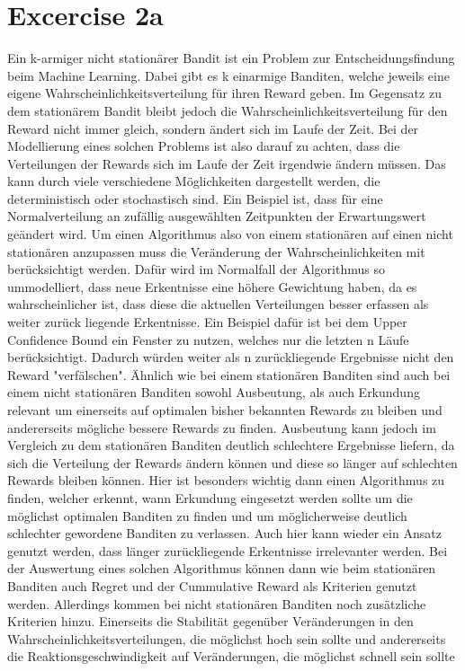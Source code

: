 \documentclass[12pt, a4paper,DIV=12, bibliography=totocnumbered]{scrartcl}
\begin{document}
\section{Excercise 2a}
Ein k-armiger nicht stationärer Bandit ist ein Problem zur Entscheidungsfindung beim Machine
Learning. Dabei gibt es k einarmige Banditen, welche jeweils eine eigene
Wahrscheinlichkeitsverteilung für ihren Reward geben.
Im Gegensatz zu dem stationärem Bandit bleibt jedoch die Wahrscheinlichkeitsverteilung für den
Reward nicht immer gleich, sondern ändert sich im Laufe der Zeit. Bei der Modellierung eines
solchen Problems ist also darauf zu achten, dass die Verteilungen der Rewards sich im Laufe der
Zeit irgendwie ändern müssen. Das kann durch viele verschiedene Möglichkeiten dargestellt
werden, die deterministisch oder stochastisch sind. Ein Beispiel ist, dass für eine Normalverteilung
an zufällig ausgewählten Zeitpunkten der Erwartungswert geändert wird. Um einen Algorithmus
also von einem stationären auf einen nicht stationären anzupassen muss die Veränderung der
Wahrscheinlichkeiten mit berücksichtigt werden. Dafür wird im Normalfall der Algorithmus so
ummodelliert, dass neue Erkentnisse eine höhere Gewichtung haben, da es wahrscheinlicher ist,
dass diese die aktuellen Verteilungen besser erfassen als weiter zurück liegende Erkentnisse. Ein
Beispiel dafür ist bei dem Upper Confidence Bound ein Fenster zu nutzen, welches nur die letzten n
Läufe berücksichtigt. Dadurch würden weiter als n zurückliegende Ergebnisse nicht den Reward
"verfälschen". Ähnlich wie bei einem stationären Banditen sind auch bei einem nicht stationären
Banditen sowohl Ausbeutung, als auch Erkundung relevant um einerseits auf optimalen bisher
bekannten Rewards zu bleiben und andererseits mögliche bessere Rewards zu finden. Ausbeutung
kann jedoch im Vergleich zu dem stationären Banditen deutlich schlechtere Ergebnisse liefern, da
sich die Verteilung der Rewards ändern können und diese so länger auf schlechten Rewards bleiben
können. Hier ist besonders wichtig dann einen Algorithmus zu finden, welcher erkennt, wann
Erkundung eingesetzt werden sollte um die möglichst optimalen Banditen zu finden und um
möglicherweise deutlich schlechter gewordene Banditen zu verlassen. Auch hier kann wieder ein
Ansatz genutzt werden, dass länger zurückliegende Erkentnisse irrelevanter werden. Bei der
Auswertung eines solchen Algorithmus können dann wie beim stationären Banditen auch Regret
und der Cummulative Reward als Kriterien genutzt werden. Allerdings kommen bei nicht
stationären Banditen noch zusätzliche Kriterien hinzu. Einerseits die Stabilität gegenüber
Veränderungen in den Wahrscheinlichkeitsverteilungen, die möglichst hoch sein sollte und
andererseits die Reaktionsgeschwindigkeit auf Veränderungen, die möglichst schnell sein sollte
\end{document}
